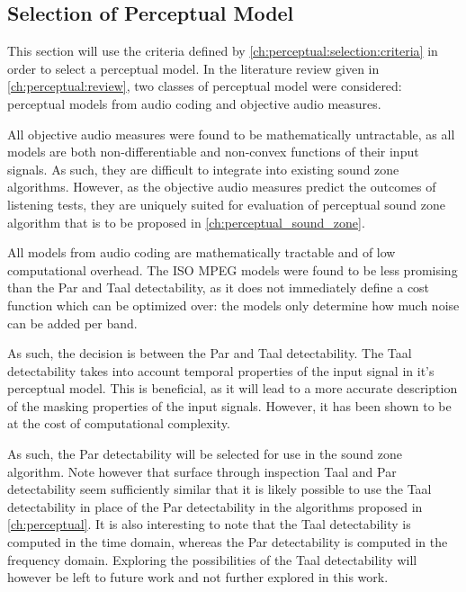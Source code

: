 \subsection{Selection of Perceptual Model}
\label{ch:perceptual:selection:selection}
This section will use the criteria defined by \autoref{ch:perceptual:selection:criteria} in order to select a perceptual
model.
In the literature review given in \autoref{ch:perceptual:review}, two classes of perceptual model were considered:
perceptual models from audio coding and objective audio measures.

All objective audio measures were found to be mathematically untractable, as all models are both non-differentiable and 
non-convex functions of their input signals.
As such, they are difficult to integrate into existing sound zone algorithms.
However, as the objective audio measures predict the outcomes of listening tests, they are uniquely suited for evaluation
of perceptual sound zone algorithm that is to be proposed in \autoref{ch:perceptual_sound_zone}.

All models from audio coding are mathematically tractable and of low computational overhead.
The ISO MPEG models were found to be less promising than the Par and Taal detectability, as it does not immediately 
define a cost function which can be optimized over:
the models only determine how much noise can be added per band.

As such, the decision is between the Par and Taal detectability.
The Taal detectability takes into account temporal properties of the input signal in it's perceptual model.
This is beneficial, as it will lead to a more accurate description of the masking properties of the input signals.
However, it has been shown to be at the cost of computational complexity.

As such, the Par detectability will be selected for use in the sound zone algorithm.
Note however that surface through inspection Taal and Par detectability seem sufficiently similar that it is likely
possible to use the Taal detectability in place of the Par detectability in the algorithms
proposed in \autoref{ch:perceptual}. 
It is also interesting to note that the Taal detectability is computed in the time domain, whereas the 
Par detectability is computed in the frequency domain.
Exploring the possibilities of the Taal detectability will however be left to future work and not further explored in this
work.
